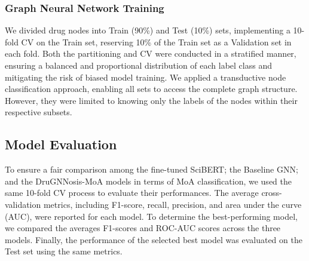 \documentclass[journal,twoside,web]{ieeecolor}
\begin{document}
\subsubsection{Graph Neural Network Training}
\label{sec:Train}
We divided drug nodes into Train (90\%) and Test (10\%) sets, implementing a 10-fold CV on the Train set, reserving 10\% of the Train set as a Validation set in each fold.
Both the partitioning and CV were conducted in a stratified manner, ensuring a balanced and proportional distribution of each label class and mitigating the risk of biased model training.
We applied a transductive node classification approach, enabling all sets to access the complete graph structure.
However, they were limited to knowing only the labels of the nodes within their respective subsets.

\subsection{Model Evaluation}
To ensure a fair comparison among the fine-tuned SciBERT; the Baseline GNN; and the DruGNNosis-MoA models in terms of MoA classification, we used the same 10-fold CV process to evaluate their performances.
The average cross-validation metrics, including F1-score, recall, precision, and area under the curve (AUC), were reported for each model.
To determine the best-performing model, we compared the averages F1-scores and ROC-AUC scores across the three models.
Finally, the performance of the selected best model was evaluated on the Test set using the same metrics.
\end{document}
